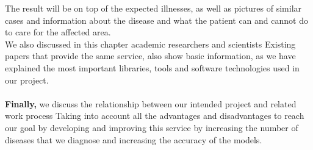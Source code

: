 The result will be on top of the expected illnesses, as well as pictures of similar cases and information about the disease and what the patient can and cannot do to care for the affected area.\\
We also discussed in this chapter academic researchers and scientists
Existing papers that provide the same service, also show basic information, as we have explained the most important libraries, tools and software technologies used in our project.\\\\
\large \textbf{Finally, }we discuss the relationship between our intended project and related work process
Taking into account all the advantages and disadvantages to reach our goal by developing and improving this service by increasing the number of diseases that we diagnose and increasing the accuracy of the models.
